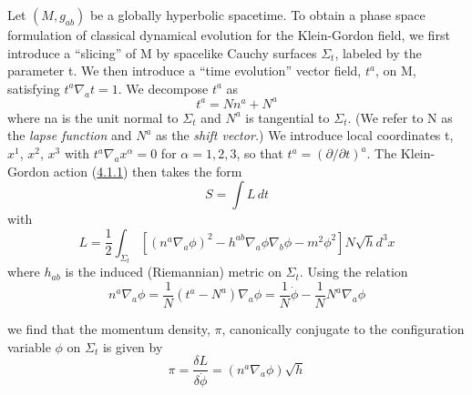 \documentclass[11pt,a4paper]{article}
\begin{document}
Let \((M, g_{ab})\) be a globally hyperbolic spacetime. To obtain a phase space formulation of classical dynamical evolution for the Klein-Gordon field, we first introduce a ``slicing'' of M by spacelike Cauchy surfaces \(\Sigma_t\), labeled by the parameter t. We then introduce a ``time evolution'' vector field, \(t^a\), on M, satisfying \(t^a \nabla_a t = 1\). We decompose \(t^a\) as
\begin{equation*}
t^a = Nn^a + N^a \tag{4.2.1}\label{eq:4.2.1}
\end{equation*}
where na is the unit normal to \(\Sigma_t\) and \(N^a\) is tangential to \(\Sigma_t\). (We refer to N as the \emph{lapse function} and \(N^a\) as the \emph{shift vector.}) We introduce local coordinates t, \(x^1\), \(x^2\), \(x^3\) with \(t^a\nabla_a x^\alpha=0\) for \(\alpha=1,2,3\), so that \(t^a=(\partial/\partial t)^a\). The Klein-Gordon action (\hyperref[eq:4.1.1]{4.1.1}) then takes the form
\begin{equation*}
S = \int L\,dt \tag{4.2.2}\label{eq:4.2.2}
\end{equation*}
with
\begin{equation*}
L = \frac{1}{2} \int_{\Sigma_t} [(n^a \nabla_a \phi)^2 - h^{ab} \nabla_a \phi \nabla_b \phi - m^2 \phi^2] N \sqrt{h} d^3x \tag{4.2.3}\label{eq:4.2.3}
\end{equation*}
where \(h_{ab}\) is the induced (Riemannian) metric on \(\Sigma_t\). Using the relation
\begin{equation*}
n^{a}\nabla_{a}\phi = \frac{1}{N}(t^{a} - N^{a})\nabla_{a}\phi = \frac{1}{N}\dot{\phi} - \frac{1}{N}N^{a}\nabla_{a}\phi \tag{4.2.4}\label{eq:4.2.4}
\end{equation*}

we find that the momentum density, \(\pi\), canonically conjugate to the configuration variable \(\phi\) on \(\Sigma_t\) is given by
\begin{equation*}
\pi = \frac{\delta L}{\delta\dot\phi} = (n^a \nabla_a \phi) \sqrt{h} \tag{4.2.5}\label{eq:4.2.5}
\end{equation*}
\end{document}
